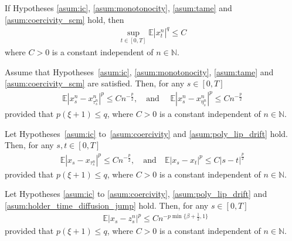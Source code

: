 \documentclass[10pt,a4paper]{amsart}
\newcommand{\E}{\mathbb E}
\begin{document}
\begin{lemma} \label{lem:scm_mb}
	If Hypotheses  \mbox{\normalfont  \ref{asum:ic}}, \mbox{\normalfont  \ref{asum:monotonocity}},      \mbox{\normalfont  \ref{asum:tame}} and {\mbox{\normalfont  \ref{asum:coercivity_scm}}} hold, then 
	\begin{align*}
		\sup_{ t\in[0,T]}\E|x_t^{n}|^{q}\leq  C
	\end{align*}
	where $C>0$ is a constant  independent  of $n\in\mathbb N$.
\end{lemma}

\begin{cor} \label{cor:one_step_error}
	Assume that Hypotheses~{\mbox{\normalfont  \ref{asum:ic}}, \mbox{\normalfont  \ref{asum:monotonocity}},      \mbox{\normalfont  \ref{asum:tame}} and \mbox{\normalfont  \ref{asum:coercivity_scm}}}  are satisfied. Then, for any \( s \in [0, T] \)
	\begin{align*}
		\mathbb{E}|x_s^{n} - x_{\tau^n_s}^{n}|^{p} \leq C n^{-\frac{p}{2}}, \quad \mbox{and } \quad	\mathbb{E}|x_s^{n} - x_{\eta^n_s}^{n}|^{p} \leq C n^{-\frac{p}{2}}
	\end{align*}
	provided that \( p(\xi + 1) \leq q \), where \( C > 0 \) is a constant independent of \( n \in \mathbb{N} \).
\end{cor}

\begin{cor} \label{cor:one_step_regularity_sde}
	Let Hypotheses~\mbox{\normalfont\ref{asum:ic}} to~\mbox{\normalfont\ref{asum:coercivity}} and \ref{asum:poly_lip_drift} hold. Then, for any \( s,t \in [0, T] \)
	\begin{align*}
		\mathbb{E}|x_s - x_{\tau^n_s}|^p \leq C n^{-\frac{p}{2}},  
		\quad \text{and} \quad 
		\mathbb{E}|x_s - x_t|^p \leq C |s - t|^{\frac{p}{2}}
	\end{align*}
	provided that \( p(\xi + 1) \leq q \), where \( C > 0 \) is a constant independent of \( n \in \mathbb{N} \).
\end{cor}

\begin{lemma} \label{lem:estimate_first_term_MR}
	Let Hypotheses \mbox{\normalfont  \ref{asum:ic}} to \mbox{\normalfont \ref{asum:coercivity}}, \textnormal{\ref{asum:poly_lip_drift}} and \textnormal{\ref{asum:holder_time_diffusion_jump}} hold.
	Then, for any   $s\in[0,T]$ 
	\begin{align*}
		&\E|x_s-z_s^{n}|^{p}
		\leq  C  n^{-p\min\{\beta+\frac{1}{2},1\}} 
	\end{align*}
	provided that $p(\xi+1)\leq q$,	where $C>0$    is a constant independent of  $n\in \mathbb N$. 
\end{lemma}
\end{document}
